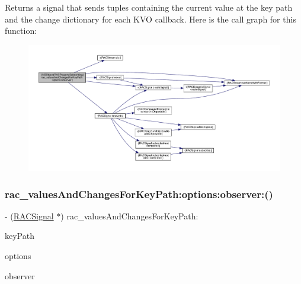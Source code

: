 Returns a signal that sends tuples containing the current value at the key path and the change dictionary for each K\+VO callback. Here is the call graph for this function\+:\nopagebreak
\begin{figure}[H]
\begin{center}
\leavevmode
\includegraphics[width=350pt]{category_n_s_object_07_r_a_c_property_subscribing_08_a0cfc29dcd9e667013645d785d194fd7e_cgraph}
\end{center}
\end{figure}
\mbox{\label{category_n_s_object_07_r_a_c_property_subscribing_08_a0cfc29dcd9e667013645d785d194fd7e}} 
\subsubsection{\texorpdfstring{rac\+\_\+values\+And\+Changes\+For\+Key\+Path\+:options\+:observer\+:()}{rac\_valuesAndChangesForKeyPath:options:observer:()}\hspace{0.1cm}{\footnotesize\ttfamily [2/3]}}
{\footnotesize\ttfamily -\/ (\mbox{\hyperlink{interface_r_a_c_signal}{R\+A\+C\+Signal}} $\ast$) rac\+\_\+values\+And\+Changes\+For\+Key\+Path\+: \begin{DoxyParamCaption}\item[{(N\+S\+String $\ast$)}]{key\+Path }\item[{options:(N\+S\+Key\+Value\+Observing\+Options)}]{options }\item[{observer:(\+\_\+\+\_\+weak N\+S\+Object $\ast$)}]{observer }\end{DoxyParamCaption}}


